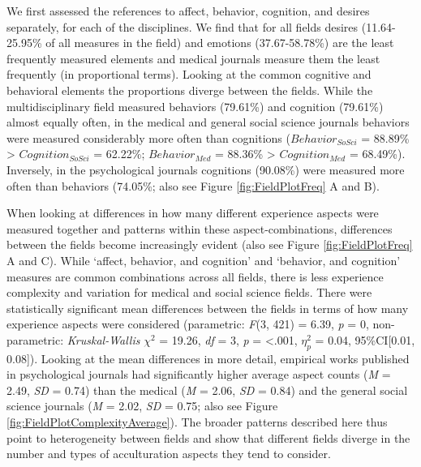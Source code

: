 We first assessed the references to affect, behavior, cognition, and
desires separately, for each of the disciplines. We find that for all
fields desires (11.64-25.95\% of all measures in the field) and emotions
(37.67-58.78\%) are the least frequently measured elements and medical
journals measure them the least frequently (in proportional terms).
Looking at the common cognitive and behavioral elements the proportions
diverge between the fields. While the multidisciplinary field measured
behaviors (79.61\%) and cognition (79.61\%) almost equally often, in the
medical and general social science journals behaviors were measured
considerably more often than cognitions (\(Behavior_{SoSci}\) = 88.89\%
\textgreater{} \(Cognition_{SoSci}\) = 62.22\%; \(Behavior_{Med}\) =
88.36\% \textgreater{} \(Cognition_{Med}\) = 68.49\%). Inversely, in the
psychological journals cognitions (90.08\%) were measured more often
than behaviors (74.05\%; also see Figure \ref{fig:FieldPlotFreq} A and
B).

When looking at differences in how many different experience aspects
were measured together and patterns within these aspect-combinations,
differences between the fields become increasingly evident (also see
Figure \ref{fig:FieldPlotFreq} A and C). While `affect, behavior, and
cognition' and `behavior, and cognition' measures are common
combinations across all fields, there is less experience complexity and
variation for medical and social science fields. There were
statistically significant mean differences between the fields in terms
of how many experience aspects were considered (parametric:
\textit{F}(3, 421) = 6.39, \textit{p} = 0, non-parametric:
\textit{Kruskal-Wallis} \(\chi^{2}\) = 19.26, \textit{df} = 3,
\textit{p} = \textless.001, \(\eta_{p}^{2}\) = 0.04, 95\%CI{[}0.01,
0.08{]}). Looking at the mean differences in more detail, empirical
works published in psychological journals had significantly higher
average aspect counts (\textit{M} = 2.49, \textit{SD} = 0.74) than the
medical (\textit{M} = 2.06, \textit{SD} = 0.84) and the general social
science journals (\textit{M} = 2.02, \textit{SD} = 0.75; also see Figure
\ref{fig:FieldPlotComplexityAverage}). The broader patterns described
here thus point to heterogeneity between fields and show that different
fields diverge in the number and types of acculturation aspects they
tend to consider.

